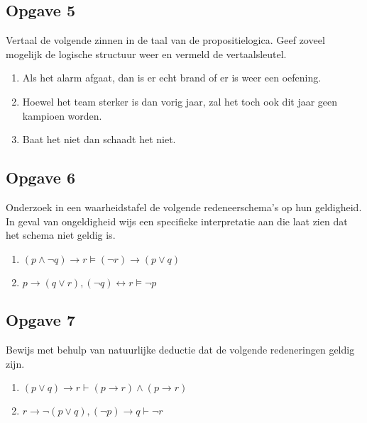 \documentclass[11pt]{article}
\begin{document}
\subsection*{Opgave 5}
Vertaal de volgende zinnen in de taal van de propositielogica. Geef zoveel mogelijk de logische structuur weer en vermeld de vertaalsleutel.

\begin{enumerate}[label=\alph*]

	\item Als het alarm afgaat, dan is er echt brand of er is weer een oefening.

	\item Hoewel het team sterker is dan vorig jaar, zal het toch ook dit jaar geen kampioen worden.

	\item Baat het niet dan schaadt het niet.

\end{enumerate}


\subsection*{Opgave 6}
Onderzoek in een waarheidstafel de volgende redeneerschema's op hun geldigheid. In geval van ongeldigheid wijs een specifieke interpretatie aan die laat zien dat het schema niet geldig is.

\begin{enumerate}[label=\alph*]

	\item $(p\wedge\neg q)\rightarrow r \models (\neg r) \rightarrow (p\vee q)$

	\item $p\rightarrow(q\vee r), (\neg q) \leftrightarrow r \models \neg p$

\end{enumerate}


\subsection*{Opgave 7}
Bewijs met behulp van natuurlijke deductie dat de volgende redeneringen geldig zijn.
\begin{enumerate}[label=\alph*]

	\item $(p\vee q) \rightarrow r \vdash (p \rightarrow r) \wedge (p \rightarrow r)$

	\item $r \rightarrow \neg(p \vee q), (\neg p) \rightarrow q \vdash \neg r$

\end{enumerate}
\end{document}
